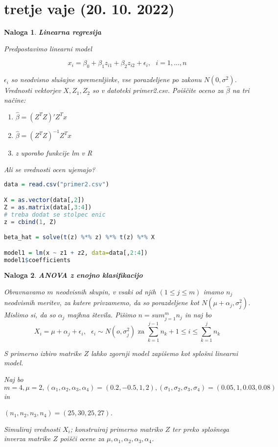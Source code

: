 \documentclass{homework}
\newtheorem{exercise}{Naloga}
\begin{document}
\section{tretje vaje (20. 10. 2022)}

\begin{exercise}

\textbf{Linearna regresija}

Predpostavimo linearni model 

$$ x_i = \beta_0 + \beta_1 z_{i1} + \beta_2 z_{i2} + \epsilon_i, \text{  } i = 1, \dots, n$$

$\epsilon_i$ so neodvisno slušajne spremenljivke, vse porazdeljene po zakonu $N(0, \sigma^2)$. Vrednosti vektorjev $X, Z_1, Z_2$ so v datoteki \emph{primer2.csv}. Poiščite oceno za $\hat{\beta}$ na tri načine:
\begin{enumerate}
  \item $\hat{\beta} = (Z^TZ)'Z^Tx$
  \item $\hat{\beta} = (Z^TZ)^{-1}Z^Tx$
  \item z uporabo funkcije lm v R
\end{enumerate}

Ali se vrednosti ocen ujemajo?
\end{exercise}

\begin{lstlisting}[language=R]
data = read.csv("primer2.csv")

X = as.vector(data[,2])
Z = as.matrix(data[,3:4])
# treba dodat se stolpec enic
z = cbind(1, Z)

beta_hat = solve(t(z) %*% z) %*% t(z) %*% X

model1 = lm(x ~ z1 + z2, data=data[,2:4])
model1$coefficients
\end{lstlisting}

\begin{exercise}
\textbf{ANOVA z enojno klasifikacijo}

Obravnavamo $m$ neodvisnih skupin, v vsaki od njih $(1 \leq j \leq m)$ imamo $n_j$ neodvisnih meritev, za katere privzamemo, da so porazdeljene kot $N(\mu + \alpha_j, \sigma_j^2)$.
Mislimo si, da so $\alpha_j$ majhna števila.
Pišimo $n = sum_{j=1}^m n_j$ in naj bo 
$$X_i = \mu + \alpha_j + \epsilon_i, \text{   } \epsilon_i \sim N(o, \sigma_j^2) \text{  za  } \sum_{k=1}^{j-1} n_k + 1 \leq i \leq \sum_{k=1}^j n_k$$

S primerno izbiro matrike $Z$ lahko zgornji model zapišemo kot splošni linearni model.

Naj bo $m = 4, \mu = 2, (\alpha_1, \alpha_2, \alpha_3, \alpha_4) = (0.2, -0.5, 1, 2), (\sigma_1, \sigma_2, \sigma_3, \sigma_4) = (0.05, 1, 0.03, 0.08)$ in 

$(n_1, n_2, n_3, n_4) = (25, 30, 25, 27)$.

Simuliraj vrednosti $X_i$; konstruiraj primerno matriko $Z$ ter preko splošnega inverza matrike $Z$ poišči ocene za $\mu, \alpha_1, \alpha_2, \alpha_3, \alpha_4$.

\end{exercise}
\end{document}
